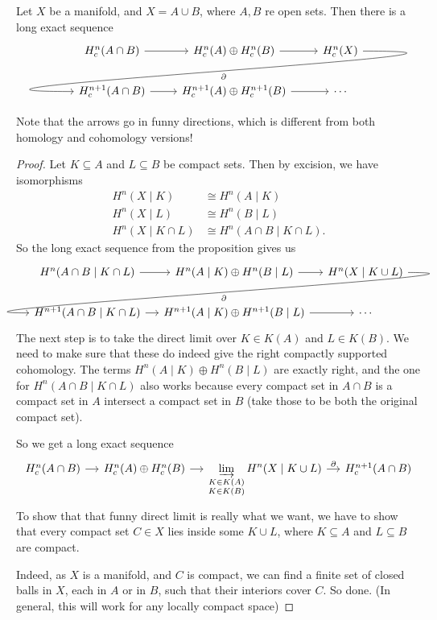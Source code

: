 \documentclass[a4paper]{article}
\begin{document}
\begin{cor}
  Let $X$ be a manifold, and $X = A \cup B$, where $A, B$ re open sets. Then there is a long exact sequence
  \[
    \begin{tikzcd}
      H^n_c(A \cap B) \ar[r] & H^n_c(A) \oplus H^n_c(B) \ar[r] & H_c^n(X)\ar[out=0, in=180, looseness=2, overlay, lld, "\partial"]\\
      H_c^{n+1}(A \cap B) \ar[r] & H_c^{n+1}(A) \oplus H_c^{n+1}(B) \ar[r] & \cdots
    \end{tikzcd}
  \]
\end{cor}
Note that the arrows go in funny directions, which is different from both homology and cohomology versions!

\begin{proof}
  Let $K \subseteq A$ and $L \subseteq B$ be compact sets. Then by excision, we have isomorphisms
  \begin{align*}
    H^n(X \mid K) &\cong H^n(A \mid K)\\
    H^n(X \mid L) &\cong H^n(B \mid L)\\
    H^n(X \mid K \cap L) &\cong H^n(A \cap B \mid K\cap L).
  \end{align*}
  So the long exact sequence from the proposition gives us
  \[
    \begin{tikzcd}[column sep=small]
      H^n(A \cap B\mid K \cap L) \ar[r] & H^n(A \mid K) \oplus H^n(B \mid L) \ar[r] & H^n(X \mid K \cup L) \ar[lld, out=0, in=180, overlay, "\partial"]\\
      H^{n + 1}(A \cap B \mid K \cap L) \ar[r] & H^{n + 1}(A \mid K) \oplus H^{n + 1}(B \mid L) \ar[r] & \cdots
    \end{tikzcd}
  \]
  The next step is to take the direct limit over $K \in K(A)$ and $L \in K(B)$. We need to make sure that these do indeed give the right compactly supported cohomology. The terms $H^n(A \mid K) \oplus H^n (B \mid L)$ are exactly right, and the one for $H^n(A \cap B \mid K \cap L)$ also works because every compact set in $A \cap B$ is a compact set in $A$ intersect a compact set in $B$ (take those to be both the original compact set).

  So we get a long exact sequence
  \[
    \begin{tikzcd}[column sep=small]
      H^n_c(A \cap B) \ar[r] & H^n_c(A) \oplus H^n_c(B) \ar[r] & \displaystyle\varinjlim_{\substack{K \in K(A)\\ K \in K(B)}} H^n(X \mid K \cup L) \ar[r, "\partial"] & H^{n + 1}_c(A \cap B)
    \end{tikzcd}
  \]
  To show that that funny direct limit is really what we want, we have to show that every compact set $C \in X$ lies inside some $K \cup L$, where $K \subseteq A$ and $L \subseteq B$ are compact.

  Indeed, as $X$ is a manifold, and $C$ is compact, we can find a finite set of closed balls in $X$, each in $A$ or in $B$, such that their interiors cover $C$. So done. (In general, this will work for any locally compact space)
\end{proof}
\end{document}
